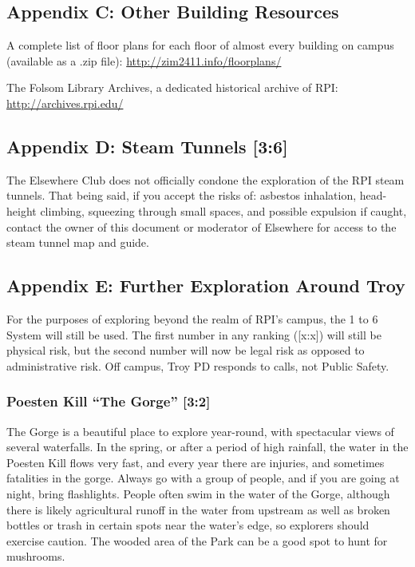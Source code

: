 \documentclass{article}
\begin{document}
\subsection{Appendix C: Other Building Resources}

A complete list of floor plans for each floor of almost every building on campus (available as a .zip file): \href{http://zim2411.info/floorplans/}{http://zim2411.info/floorplans/}

\medskip
\noindent
The Folsom Library Archives, a dedicated historical archive of RPI: \href{http://archives.rpi.edu/}{http://archives.rpi.edu/}

\subsection{Appendix D: Steam Tunnels [3:6]}
The Elsewhere Club does not officially condone the exploration of the RPI steam tunnels. That being said, if you accept the risks of: asbestos inhalation, head-height climbing, squeezing through small spaces, and possible expulsion if caught, contact the owner of this document or moderator of Elsewhere for access to the steam tunnel map and guide.

\subsection{Appendix E: Further Exploration Around Troy}
For the purposes of exploring beyond the realm of RPI’s campus, the 1 to 6 System will still be used. The first number in any ranking ([x:x]) will still be physical risk, but the second number will now be legal risk as opposed to administrative risk. Off campus, Troy PD responds to calls, not Public Safety.

\subsubsection{Poesten Kill “The Gorge” [3:2]}
The Gorge is a beautiful place to explore year-round, with spectacular views of several waterfalls. In the spring, or after a period of high rainfall, the water in the Poesten Kill flows very fast, and every year there are injuries, and sometimes fatalities in the gorge. Always go with a group of people, and if you are going at night, bring flashlights. People often swim in the water of the Gorge, although there is likely agricultural runoff in the water from upstream as well as broken bottles or trash in certain spots near the water’s edge, so explorers should exercise caution. The wooded area of the Park can be a good spot to hunt for mushrooms.
\end{document}
